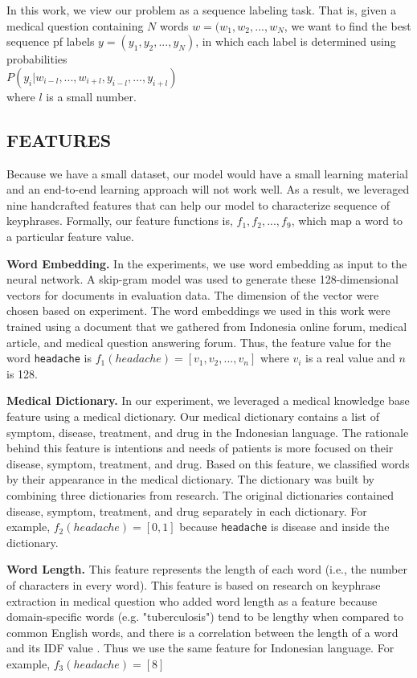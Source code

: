 In this work, we view our problem as a sequence labeling task. That is, given a medical question containing $N$ words $w = (w_1, w_2,...,w_N$, we want to find the best sequence pf labels $y = (y_1, y_2,..., y_N)$, in which each label is determined using probabilities \\$P(y_i|w_{i-l},...,w_{i+l},y_{i-l},...,y_{i+l})$ \\where $l$ is a small number.
\subsection{FEATURES}
Because we have a small dataset, our model would have a small learning material and an end-to-end learning approach will not work well. As a result, we leveraged nine handcrafted features that can help our model to characterize sequence of keyphrases. Formally, our feature functions is, $f_1, f_2, ..., f_9$, which map a word to a particular feature value.
    
    \textbf{Word Embedding.} In the experiments, we use word embedding as input to the neural network. A skip-gram model \cite{mikolov2013wordembed} was used to generate these 128-dimensional vectors for documents in evaluation data. The dimension of the vector were chosen based on \cite{skripsiWahid} experiment. The word embeddings we used in this work were trained using a document that we gathered from Indonesia online forum, medical article, and medical question answering forum. Thus, the feature value for the word \texttt{headache} is $f_1(headache) = [v_1, v_2, ..., v_n]$ where $v_i$ is a real value and $n$ is 128.
    
    \textbf{Medical Dictionary.} In our experiment, we leveraged a medical knowledge base feature using a medical dictionary. Our medical dictionary contains a list of symptom, disease, treatment, and drug in the Indonesian language. The rationale behind this feature is intentions and needs of patients is more focused on their disease, symptom, treatment, and drug. Based on this feature, we classified words by their appearance in the medical dictionary. The dictionary was built by combining three dictionaries from \cite{skripsiKakAbid} research. The original dictionaries contained disease, symptom, treatment, and drug separately in each dictionary. For example, $f_2(headache) = [0, 1]$ because \texttt{headache} is disease and inside the dictionary.
    
    \textbf{Word Length.} This feature represents the length of each word (i.e., the number of characters in every word). This feature is based on \cite{cao2010automatically} research on keyphrase extraction in medical question who added word length as a feature because domain-specific words (e.g. "tuberculosis") tend to be lengthy when compared to common English words, and there is a correlation between the length of a word and its IDF value \citep{cao2010automatically}. Thus we use the same feature for Indonesian language. For example, $f_3(headache) = [8]$
    
